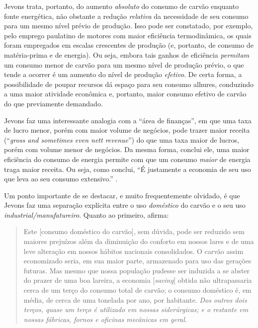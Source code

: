 Jevons trata, portanto, do aumento \textit{absoluto} do consumo de carvão enquanto fonte energética, não obstante a redução \textit{relativa} da necessidade de seu consumo para um mesmo nível prévio de produção. Isso pode ser constatado, por exemplo, pelo emprego paulatino de motores com maior eficiência termodinâmica, os quais foram empregados em escalas crescentes de produção (e, portanto, de consumo de matéria-prima e de energia). Ou seja, embora tais ganhos de eficiência \textit{permitam} um consumo menor de carvão para um mesmo nível de produção prévio, o que tende a ocorrer é um aumento do nível de produção \textit{efetivo}. De certa forma, a possibilidade de poupar recursos dá espaço para seu consumo alhures, conduzindo a uma maior atividade econômica e, portanto, maior consumo efetivo de carvão do que previamente demandado.

Jevons faz uma interessante analogia com a ``área de finanças'', em que uma taxa de lucro menor, porém com maior volume de negócios, pode trazer maior receita (``\textit{gross and sometimes even nett revenue}'') do que uma taxa maior de lucros, porém com volume menor de negócios. Da mesma forma, conclui ele, uma maior eficiência do consumo de energia permite com que um consumo \textit{maior} de energia traga maior receita. Ou seja, como conclui, ``É justamente a economia de seu uso que leva ao seu consumo extensivo.'' \cite[p. 76]{Jevons1866}. 

Um ponto importante de se destacar, e muito frequentemente olvidado, é que Jevons faz uma separação explícita entre o uso \textit{doméstico} do carvão e o seu uso \textit{industrial/manufatureiro}. Quanto ao primeiro, afirma:
\begin{quote}
    Este [consumo doméstico do carvão], sem dúvida, pode ser reduzido sem maiores prejuízos além da diminuição do conforto em nossos lares e de uma leve alteração em nossos hábitos nacionais consolidados. O carvão assim economizado seria, em sua maior parte, armazenado para uso das gerações futuras. Mas mesmo que nossa população pudesse ser induzida a se abster do prazer de uma boa lareira, a economia [\textit{saving}] obtida não ultrapassaria cerca de um terço do consumo total de carvão; o consumo doméstico é, em média, de cerca de uma tonelada por ano, por habitante. \textit{Dos outros dois terços, quase um terço é utilizado em nossas siderúrgicas; e o restante em nossas fábricas, fornos e oficinas mecânicas em geral.} \cite[p. 75, grifo meu]{Jevons1866}
\end{quote}

